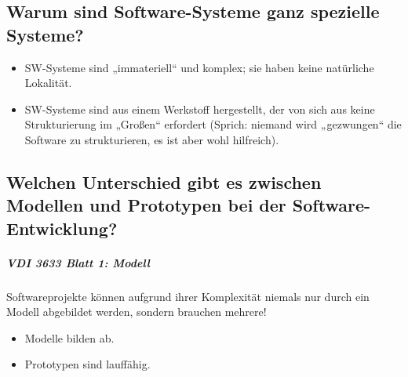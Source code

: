 \documentclass{scrreprt}
\begin{document}
\subsection{Warum sind Software-Systeme ganz spezielle Systeme?}
\begin{itemize}
\item SW-Systeme sind „immateriell“ und komplex; sie haben keine natürliche Lokalität.
\item SW-Systeme sind aus einem Werkstoff hergestellt, der von sich aus keine Strukturierung im „Großen“ erfordert (Sprich: niemand wird „gezwungen“ die Software zu strukturieren, es ist aber wohl hilfreich).
\end{itemize}

\subsection{Welchen Unterschied gibt es zwischen Modellen und Prototypen bei der Software-Entwicklung?}
\subparagraph{VDI 3633 Blatt 1: Modell}
Softwareprojekte können aufgrund ihrer Komplexität niemals nur durch ein Modell abgebildet werden, sondern brauchen mehrere!
\begin{itemize}
\item Modelle bilden ab.
\item Prototypen sind lauffähig.
\end{itemize}
\end{document}
